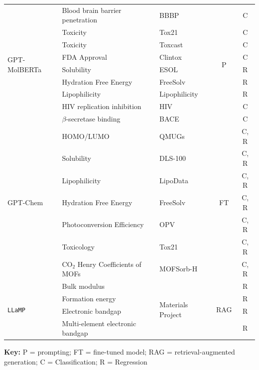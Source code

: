 \documentclass[11pt, oneside]{article}
\newcommand{\modelname}[1]{\texttt{#1}}
\providecommand{\DIFaddendFL}{} %
\DeclareRobustCommand{\DIFaddendFL}{\DIFOaddendFL \let\includegraphics\DIFOincludegraphics} %
\begin{document}
\begin{table}[htbp]
{\begin{tabular}{lllcc}
        \midrule
        \multirow{9}{*}{GPT-MolBERTa \autocite{balaji2023gptmolberta}} & Blood brain barrier penetration & BBBP\autocite{sakiyama_prediction_2021} & \multirow{9}{*}{P} & C\\
        & Toxicity & Tox21 \autocite{richard_tox21_2021} & & C\\
        & Toxicity & Toxcast \autocite{us2015toxicity} & & C\\
        & FDA Approval & Clintox \autocite{wu2018moleculenet} & & C \\
        & Solubility & ESOL \autocite{delaneyesol2004} & & R\\
        & Hydration Free Energy& FreeSolv\autocite{mobley_freesolv_2014} & &R \\
        & Lipophilicity & Lipophilicity \autocite{wu2018moleculenet}& & R\\
        & HIV replication inhibition& HIV\autocite{wu2018moleculenet} & & C\\
        &  $\beta$-secretase binding & BACE \autocite{wu2018moleculenet} & &  C\\
        \midrule
        \multirow{7}{*}{GPT-Chem\autocite{jablonka2024leveraging}} & HOMO/LUMO & QMUGs\autocite{isert_qmugs_2022} & \multirow{7}{*}{FT} & C, R \\
        & Solubility & DLS-100\autocite{mitchell_dls-100_2017} & & C, R \\
        & Lipophilicity & LipoData\autocite{jablonka2024leveraging} & & C, R \\
        & Hydration Free Energy & FreeSolv\autocite{mobley_freesolv_2014} & & C, R \\
        & Photoconversion Efficiency & OPV\autocite{jablonka2024leveraging} & & C, R  \\
        & Toxicology & Tox21\autocite{richard_tox21_2021} & & C, R  \\
        & $\text{CO}_2$ Henry Coefficients of MOFs & MOFSorb-H\autocite{lin_silico_2012} & & C, R \\        
        \midrule
        \multirow{4}{*}{\modelname{LLaMP\autocite{chiang2024llamp}}} & Bulk modulus & \multirow{4}{*}{Materials Project\autocite{riebesell2025framework}} & \multirow{4}{*}{RAG} & R \\
        & Formation energy & & & R \\
        & Electronic bandgap & & & R \\
        & Multi-element electronic bandgap & & & R \\
        \bottomrule
    \end{tabular}
    }
    \DIFaddendFL \vspace{0.5em}
    \footnotesize
    \begin{minipage}{\linewidth}
        \textbf{Key:}  P = prompting; FT = fine-tuned model; RAG = retrieval-augmented generation; C = Classification; R = Regression
    \end{minipage}
\end{table}
\end{document}
